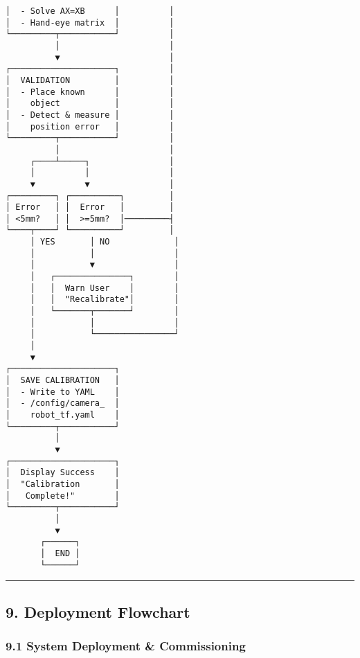 \documentclass[
]{article}
\begin{document}
\begin{verbatim}
│  - Solve AX=XB      │          │
│  - Hand-eye matrix  │          │
└─────────┬───────────┘          │
          │                      │
          ▼                      │
┌─────────────────────┐          │
│  VALIDATION         │          │
│  - Place known      │          │
│    object           │          │
│  - Detect & measure │          │
│    position error   │          │
└─────────┬───────────┘          │
          │                      │
     ┌────┴─────┐                │
     │          │                │
     ▼          ▼                │
┌─────────┐ ┌──────────┐         │
│ Error   │ │  Error   │         │
│ <5mm?   │ │  >=5mm?  │─────────┤
└────┬────┘ └──────────┘         │
     │ YES       │ NO             │
     │           │                │
     │           ▼                │
     │   ┌───────────────┐        │
     │   │  Warn User    │        │
     │   │  "Recalibrate"│        │
     │   └───────┬───────┘        │
     │           │                │
     │           └────────────────┘
     │
     ▼
┌─────────────────────┐
│  SAVE CALIBRATION   │
│  - Write to YAML    │
│  - /config/camera_  │
│    robot_tf.yaml    │
└─────────┬───────────┘
          │
          ▼
┌─────────────────────┐
│  Display Success    │
│  "Calibration       │
│   Complete!"        │
└─────────┬───────────┘
          │
          ▼
       ┌──────┐
       │  END │
       └──────┘
\end{verbatim}

\begin{center}\rule{0.5\linewidth}{0.5pt}\end{center}

\hypertarget{deployment-flowchart}{%
\subsection{9. Deployment Flowchart}\label{deployment-flowchart}}

\hypertarget{system-deployment-commissioning}{%
\subsubsection{9.1 System Deployment \&
Commissioning}\label{system-deployment-commissioning}}
\end{document}
